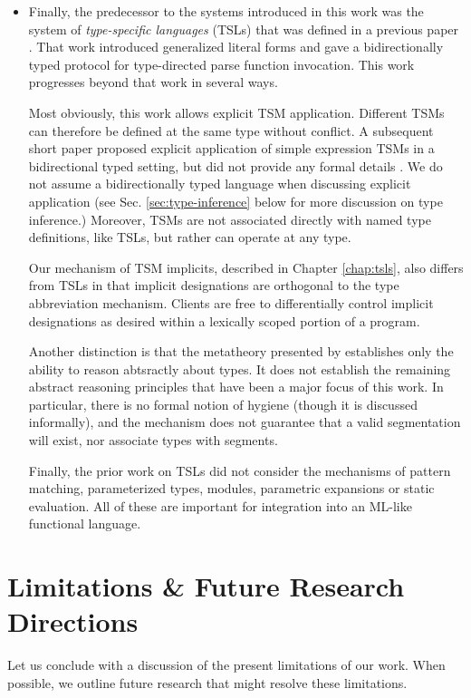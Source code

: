 \begin{itemize}
\item Finally, the predecessor to the systems introduced in this work was the system of \emph{type-specific languages} (TSLs) that was defined in a previous paper \cite{TSLs}. That work introduced generalized literal forms and gave a bidirectionally typed protocol for type-directed parse function invocation. This work progresses beyond that work in several ways.

Most obviously, this work allows explicit TSM application. Different TSMs can therefore be defined at the same type without conflict. A subsequent short paper proposed explicit application of simple expression TSMs in a bidirectional typed setting, but did not provide any formal details \citet{sac15}. We do not assume a bidirectionally typed language when discussing explicit application (see Sec. \ref{sec:type-inference} below for more discussion on type inference.) 
Moreover, TSMs are not associated directly with named type definitions, like TSLs,  but rather can operate at any type.  

Our mechanism of TSM implicits, described in Chapter \ref{chap:tsls}, also differs from TSLs in that implicit designations are orthogonal to the type abbreviation mechanism. Clients are free to differentially control implicit designations as desired within a lexically scoped portion of a program.

Another distinction is that the metatheory presented by \citet{TSLs} establishes only the ability to reason abtsractly about types. It does not establish the remaining abstract reasoning principles that have been a major focus of this work. In particular, there is no formal notion of hygiene (though it is discussed informally), and the mechanism does not guarantee that a valid segmentation will exist, nor associate types with segments.

Finally, the prior work on TSLs did not consider the mechanisms of pattern matching, parameterized types, modules, parametric expansions or static evaluation. All of these are important for integration into an ML-like functional language.

\end{itemize}

\vspace{-8px}
\section{Limitations \& Future Research Directions}\label{sec:future-work}
Let us conclude with a discussion of the present limitations of our work. When possible, we outline future research that might resolve these limitations.

